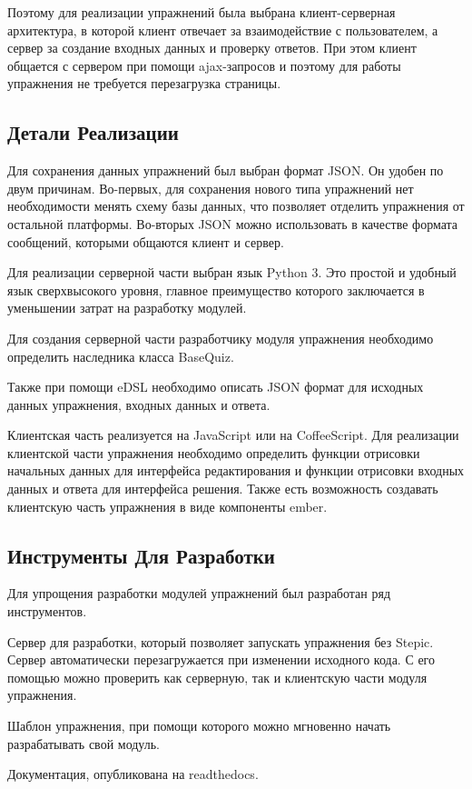 \documentclass{matmex-diploma-custom}
\begin{document}
Поэтому для реализации упражнений была выбрана клиент-серверная
архитектура, в которой клиент отвечает за взаимодействие с
пользователем, а сервер за создание входных данных и проверку
ответов. При этом клиент общается с сервером при помощи ajax-запросов
и поэтому для работы упражнения не требуется перезагрузка страницы.

\subsection{Детали Реализации}
Для сохранения данных упражнений был выбран формат JSON. Он удобен по
двум причинам. Во-первых, для сохранения нового типа упражнений нет
необходимости менять схему базы данных, что позволяет отделить
упражнения от остальной платформы. Во-вторых JSON можно использовать в
качестве формата сообщений, которыми общаются клиент и сервер.

Для реализации серверной части выбран язык Python 3. Это простой и
удобный язык сверхвысокого уровня, главное преимущество которого
заключается в уменьшении затрат на разработку модулей.

Для создания серверной части разработчику модуля упражнения необходимо
определить наследника класса BaseQuiz.

Также при помощи eDSL необходимо описать JSON формат для исходных
данных упражнения, входных данных и ответа.

Клиентская часть реализуется на JavaScript или на CoffeeScript. Для
реализации клиентской части упражнения необходимо определить функции
отрисовки начальных данных для интерфейса редактирования и функции
отрисовки входных данных и ответа для интерфейса решения. Также есть
возможность создавать клиентскую часть упражнения в виде компоненты ember.

\subsection{Инструменты Для Разработки}
Для упрощения разработки модулей упражнений был разработан ряд
инструментов.

Сервер для разработки, который позволяет запускать упражнения без
Stepic. Сервер автоматически перезагружается при изменении исходного
кода. С его помощью можно проверить как серверную, так и клиентскую
части модуля упражнения.

Шаблон упражнения, при помощи которого можно мгновенно начать
разрабатывать свой модуль.

Документация, опубликована на readthedocs.
\end{document}
